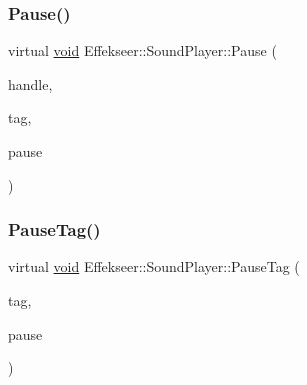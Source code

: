 \mbox{\label{class_effekseer_1_1_sound_player_ae7dc7d8e0dca428ac9bde68cebb7fedf}} 
\subsubsection{\texorpdfstring{Pause()}{Pause()}}
{\footnotesize\ttfamily virtual \mbox{\hyperlink{namespace_effekseer_ab34c4088e512200cf4c2716f168deb56}{void}} Effekseer\+::\+Sound\+Player\+::\+Pause (\begin{DoxyParamCaption}\item[{\mbox{\hyperlink{namespace_effekseer_a694a300b9b688ca40f6a0d9841d437bf}{Sound\+Handle}}}]{handle,  }\item[{\mbox{\hyperlink{namespace_effekseer_adb219197297396cf2ab9bee657551a29}{Sound\+Tag}}}]{tag,  }\item[{bool}]{pause }\end{DoxyParamCaption})\hspace{0.3cm}{\ttfamily [pure virtual]}}

\mbox{\label{class_effekseer_1_1_sound_player_a331ad801eed06611fffc50354837b70e}} 
\subsubsection{\texorpdfstring{Pause\+Tag()}{PauseTag()}}
{\footnotesize\ttfamily virtual \mbox{\hyperlink{namespace_effekseer_ab34c4088e512200cf4c2716f168deb56}{void}} Effekseer\+::\+Sound\+Player\+::\+Pause\+Tag (\begin{DoxyParamCaption}\item[{\mbox{\hyperlink{namespace_effekseer_adb219197297396cf2ab9bee657551a29}{Sound\+Tag}}}]{tag,  }\item[{bool}]{pause }\end{DoxyParamCaption})\hspace{0.3cm}{\ttfamily [pure virtual]}}

\mbox{\label{class_effekseer_1_1_sound_player_aaea571e89a22b2b0a8971bfb52176622}} 
